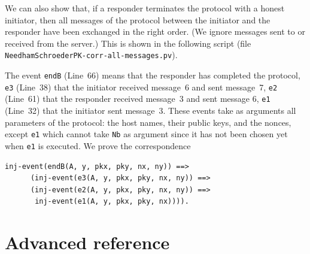\documentclass{book}
\begin{document}
We can also show that, if a responder terminates the protocol with a
honest initiator, then all messages of the protocol between the
initiator and the responder have been exchanged in the right
order. (We ignore messages sent to or received from the server.) This
is shown in the following script (file {\tt
  {\docexdir}NeedhamSchroederPK-corr-all-messages.pv}).
%

%
The event \lstinline!endB! (Line~66) means that the responder has completed the protocol,
\lstinline!e3! (Line~38) that the initiator received message~6 and sent message~7,
\lstinline!e2! (Line~61) that the responder received message~3 and sent message 6,
\lstinline!e1! (Line~32) that the initiator sent message~3. These events take as arguments
all parameters of the protocol: the host names, their public keys, and the nonces,
except \lstinline!e1! which cannot take \lstinline!Nb! as argument since it has
not been chosen yet when \lstinline!e1! is executed. We prove
the correspondence
\begin{lstlisting}[numbers=none]
      inj-event(endB(A, y, pkx, pky, nx, ny)) ==>
      (inj-event(e3(A, y, pkx, pky, nx, ny)) ==>
      (inj-event(e2(A, y, pkx, pky, nx, ny)) ==>
       inj-event(e1(A, y, pkx, pky, nx)))).
\end{lstlisting}



\chapter{Advanced reference}\label{sec:advTheory}
\end{document}

